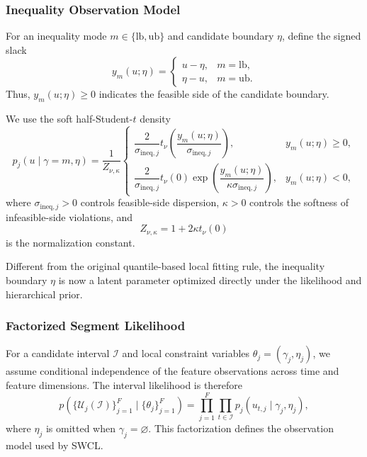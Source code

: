 \documentclass[lettersize,journal]{IEEEtran}
\begin{document}
\subsubsection{Inequality Observation Model}

For an inequality mode
$m\in\{\mathrm{lb},\mathrm{ub}\}$ and candidate boundary $\eta$, define the
signed slack
\begin{equation}
y_m(u;\eta)
=
\begin{cases}
u-\eta,
& m=\mathrm{lb},
\\
\eta-u,
& m=\mathrm{ub}.
\end{cases}
\label{eq:map_inequality_slack}
\end{equation}
Thus, $y_m(u;\eta)\geq0$ indicates the feasible side of the candidate boundary.

We use the soft half-Student-$t$ density
\begin{equation}
p_j
\left(
u
\mid
\gamma=m,
\eta
\right)
=
\frac{1}{Z_{\nu,\kappa}}
\begin{cases}
\dfrac{2}{\sigma_{\mathrm{ineq},j}}
t_\nu
\left(
\dfrac{y_m(u;\eta)}
{\sigma_{\mathrm{ineq},j}}
\right),
& y_m(u;\eta)\geq0,
\\[1em]
\dfrac{2}{\sigma_{\mathrm{ineq},j}}
t_\nu(0)
\exp
\left(
\dfrac{y_m(u;\eta)}
{\kappa\sigma_{\mathrm{ineq},j}}
\right),
& y_m(u;\eta)<0,
\end{cases}
\label{eq:map_soft_half_t_density}
\end{equation}
where $\sigma_{\mathrm{ineq},j}>0$ controls feasible-side dispersion,
$\kappa>0$ controls the softness of infeasible-side violations, and
\begin{equation}
Z_{\nu,\kappa}
=
1+2\kappa t_\nu(0)
\label{eq:map_half_t_normalizer}
\end{equation}
is the normalization constant.

Different from the original quantile-based local fitting rule, the inequality
boundary $\eta$ is now a latent parameter optimized directly under the
likelihood and hierarchical prior.

\subsubsection{Factorized Segment Likelihood}

For a candidate interval $\mathcal{I}$ and local constraint variables
$\theta_j=(\gamma_j,\eta_j)$, we assume conditional independence of the feature
observations across time and feature dimensions. The interval likelihood is
therefore
\begin{equation}
p
\left(
\{\mathcal{U}_j(\mathcal{I})\}_{j=1}^{F}
\mid
\{\theta_j\}_{j=1}^{F}
\right)
=
\prod_{j=1}^{F}
\prod_{t\in\mathcal{I}}
p_j
\left(
u_{t,j}
\mid
\gamma_j,\eta_j
\right),
\label{eq:factorized_segment_likelihood}
\end{equation}
where $\eta_j$ is omitted when $\gamma_j=\varnothing$.
This factorization defines the observation model used by SWCL.
\end{document}
